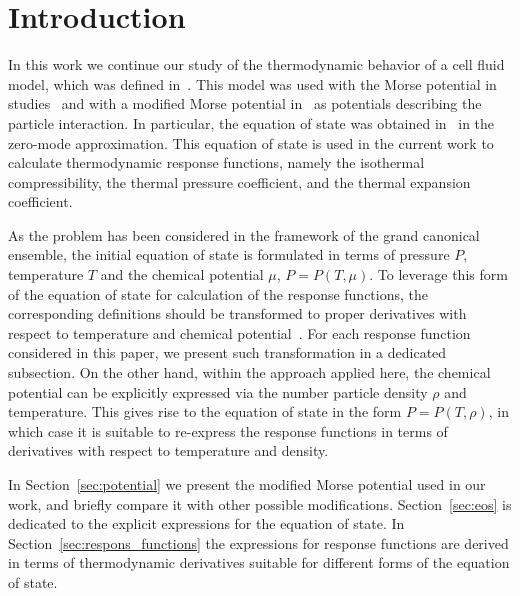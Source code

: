 \section{Introduction}
In this work we continue our study of the thermodynamic behavior of a cell fluid model, which was defined in~\cite{KozitskyKozlovskiiDobush2018book,KozitskyKozlovskiiDobush2020}. This model was used with the Morse potential in studies~\cite{PylyukEtAlJML2023,PylyukKozlovskiiDobushUJP2023b} and with a modified Morse potential in~\cite{KozlovskiiDobush2020,PylyukDobush2020} as potentials describing the particle interaction. In particular, the equation of state was obtained in~\cite{KozlovskiiDobush2020} in the zero-mode approximation. This equation of state is used in the current work to calculate thermodynamic response functions, namely the isothermal compressibility, the thermal pressure coefficient, and the thermal expansion coefficient. 

As the problem has been considered in the framework of the grand canonical ensemble, the initial equation of state is formulated in terms of pressure $P$, temperature $T$ and the chemical potential $\mu$, $P = P(T,\mu)$. To leverage this form of the equation of state for calculation of the response functions, the corresponding definitions should be transformed to proper derivatives with respect to temperature and chemical potential~\cite{StrokerMeier2021}. For each response function considered in this paper, we present such transformation in a dedicated subsection. On the other hand, within the approach applied here, the chemical potential can be explicitly expressed via the number particle density $\rho$ and temperature. This gives rise to the equation of state in the form $P = P(T, \rho)$, in which case it is suitable to re-express the response functions in terms of derivatives with respect to temperature and density.

In Section~\ref{sec:potential} we present the modified Morse potential used in our work, and briefly compare it with other possible modifications. Section~\ref{sec:eos} is dedicated to the explicit expressions for the equation of state. In Section~\ref{sec:respons_functions} the expressions for response functions are derived in terms of thermodynamic derivatives suitable for different forms of the equation of state.


